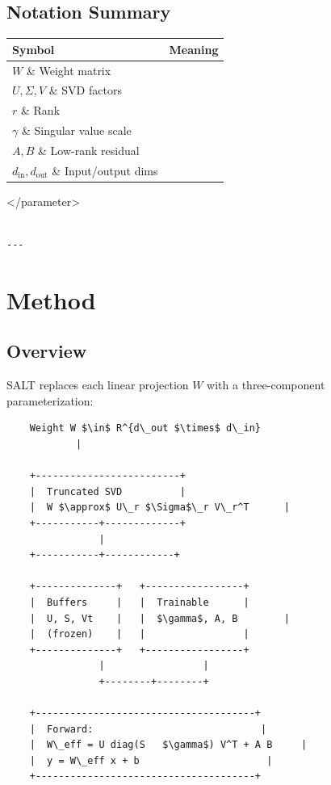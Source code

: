 \subsection{Notation Summary}

\begin{table}[H]
\centering
\small
\begin{tabular}{ll}
\toprule
\textbf{Symbol} & \textbf{Meaning} \\
\midrule
$W$ \& Weight matrix \\
$U, \Sigma, V$ \& SVD factors \\
$r$ \& Rank \\
$\gamma$ \& Singular value scale \\
$A, B$ \& Low-rank residual \\
$d_\text{in}, d_\text{out}$ \& Input/output dims \\
\bottomrule
\end{tabular}
\end{table}
\textless{}/parameter\textgreater{}
\begin{lstlisting}

---
\end{lstlisting}


\section{Method}

\subsection{Overview}

SALT replaces each linear projection $W$ with a three-component parameterization:

\begin{lstlisting}
    Weight W $\in$ R^{d\_out $\times$ d\_in}
            |
             
    +-------------------------+
    |  Truncated SVD          |
    |  W $\approx$ U\_r $\Sigma$\_r V\_r^T      |
    +-----------+-------------+
                |
    +-----------+------------+
                              
    +--------------+   +-----------------+
    |  Buffers     |   |  Trainable      |
    |  U, S, Vt    |   |  $\gamma$, A, B        |
    |  (frozen)    |   |                 |
    +--------------+   +-----------------+
                |                 |
                +--------+--------+
                          
    +--------------------------------------+
    |  Forward:                             |
    |  W\_eff = U diag(S   $\gamma$) V^T + A B     |
    |  y = W\_eff x + b                      |
    +--------------------------------------+
\end{lstlisting}

